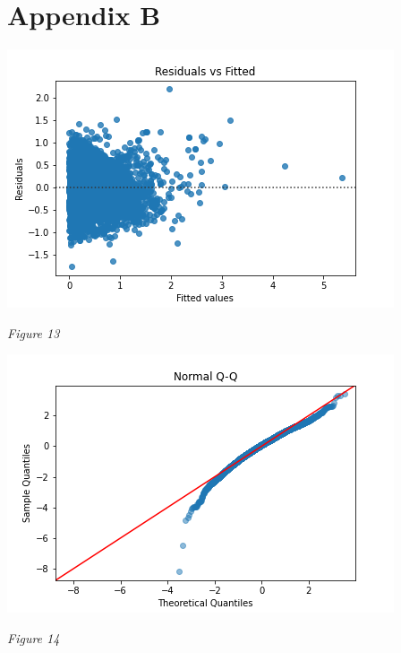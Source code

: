 \documentclass[12pt]{report}
\newenvironment{Figure}
{\par\medskip\noindent\minipage{\linewidth}}
{\endminipage\par\medskip}
\begin{document}
\section*{Appendix B}
\begin{multicols}{2}
\begin{Figure}
\centering
\includegraphics[width=\linewidth]{resid.png}
\end{Figure}
\begin{center}
\emph{Figure 13}\\
\end{center}

\begin{Figure}
\centering
\includegraphics[width=\linewidth]{normalqq.png}
\end{Figure}
\begin{center}
\emph{Figure 14}\\
\end{center}
\end{multicols}
\clearpage
\end{document}
